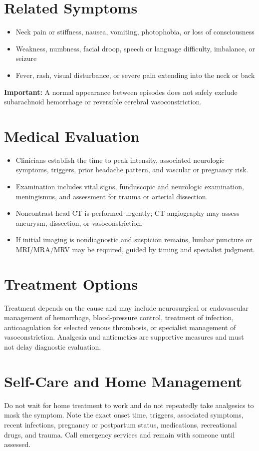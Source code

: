 \section*{Related Symptoms}
\begin{itemize}
  \item Neck pain or stiffness, nausea, vomiting, photophobia, or loss of consciousness
  \item Weakness, numbness, facial droop, speech or language difficulty, imbalance, or seizure
  \item Fever, rash, visual disturbance, or severe pain extending into the neck or back
\end{itemize}
\textbf{Important:} A normal appearance between episodes does not safely exclude subarachnoid hemorrhage or reversible cerebral vasoconstriction.

\section*{Medical Evaluation}
\begin{itemize}
  \item Clinicians establish the time to peak intensity, associated neurologic symptoms, triggers, prior headache pattern, and vascular or pregnancy risk.
  \item Examination includes vital signs, funduscopic and neurologic examination, meningismus, and assessment for trauma or arterial dissection.
  \item Noncontrast head CT is performed urgently; CT angiography may assess aneurysm, dissection, or vasoconstriction.
  \item If initial imaging is nondiagnostic and suspicion remains, lumbar puncture or MRI/MRA/MRV may be required, guided by timing and specialist judgment.
\end{itemize}

\section*{Treatment Options}
Treatment depends on the cause and may include neurosurgical or endovascular management of hemorrhage, blood-pressure control, treatment of infection, anticoagulation for selected venous thrombosis, or specialist management of vasoconstriction. Analgesia and antiemetics are supportive measures and must not delay diagnostic evaluation.

\section*{Self-Care and Home Management}
Do not wait for home treatment to work and do not repeatedly take analgesics to mask the symptom. Note the exact onset time, triggers, associated symptoms, recent infections, pregnancy or postpartum status, medications, recreational drugs, and trauma. Call emergency services and remain with someone until assessed.

